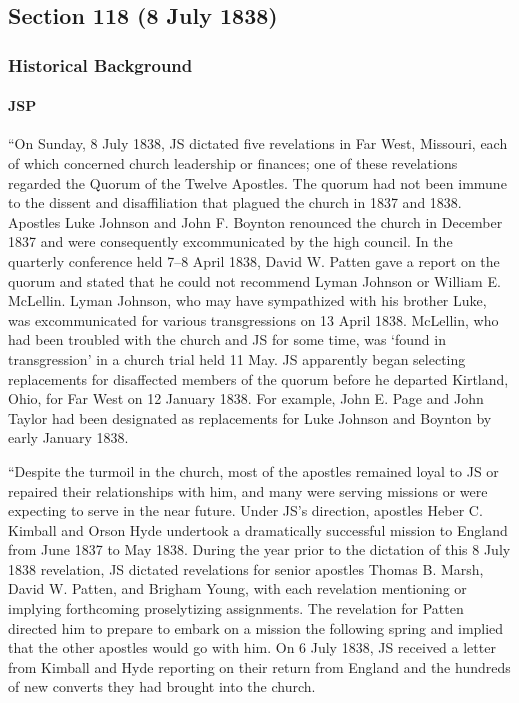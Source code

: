 \subsection{Section 118 (8 July 1838)}
	\label{DC118}
	
	\subsubsection{Historical Background}
		\label{DC118-HB}
		
		\paragraph{JSP}
		
			``On Sunday, 8 July 1838, JS dictated five revelations in Far West, Missouri, each of which concerned church leadership or finances; one of these revelations regarded the Quorum of the Twelve Apostles. The quorum had not been immune to the dissent and disaffiliation that plagued the church in 1837 and 1838. Apostles Luke Johnson and John F. Boynton renounced the church in December 1837 and were consequently excommunicated by the high council. In the quarterly conference held 7--8 April 1838, David W. Patten gave a report on the quorum and stated that he could not recommend Lyman Johnson or William E. McLellin. Lyman Johnson, who may have sympathized with his brother Luke, was excommunicated for various transgressions on 13 April 1838. McLellin, who had been troubled with the church and JS for some time, was `found in transgression' in a church trial held 11 May. JS apparently began selecting replacements for disaffected members of the quorum before he departed Kirtland, Ohio, for Far West on 12 January 1838. For example, John E. Page and John Taylor had been designated as replacements for Luke Johnson and Boynton by early January 1838.
			
			``Despite the turmoil in the church, most of the apostles remained loyal to JS or repaired their relationships with him, and many were serving missions or were expecting to serve in the near future. Under JS's direction, apostles Heber C. Kimball and Orson Hyde undertook a dramatically successful mission to England from June 1837 to May 1838. During the year prior to the dictation of this 8 July 1838 revelation, JS dictated revelations for senior apostles Thomas B. Marsh, David W. Patten, and Brigham Young, with each revelation mentioning or implying forthcoming proselytizing assignments. The revelation for Patten directed him to prepare to embark on a mission the following spring and implied that the other apostles would go with him. On 6 July 1838, JS received a letter from Kimball and Hyde reporting on their return from England and the hundreds of new converts they had brought into the church.
			
